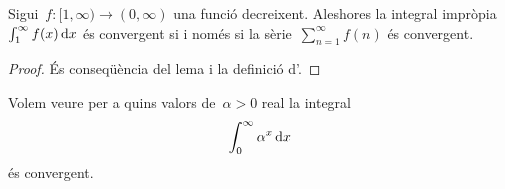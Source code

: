 \documentclass[../../main.tex]{subfiles}
\begin{document}
    \begin{solution}
    \end{solution}
    \begin{theorem}
        \label{thm:criteri de la integral per integrals impròpies}
        Sigui~\(f\colon[1,\infty)\longrightarrow(0,\infty)\) una funció decreixent.
        Aleshores la integral impròpia~\(\int_{1}^{\infty}f(x)\mathop{}\!\mathrm{d} x\) és convergent si i només si la sèrie~\(\sum_{n=1}^{\infty}f(n)\) és convergent.
    \end{theorem}
    \begin{proof}
        És conseqüència del lema  i la definició d'.
    \end{proof}
    \begin{example}
        \label{ex:criteri de la integral per integrals impròpies}
        Volem veure per a quins valors de~\(\alpha>0\) real la integral
        \begin{equation}
            \label{ex:criteri de la integral per integrals impròpies:eq1}
            \int_{0}^{\infty}\alpha^{x}\mathop{}\!\mathrm{d} x
        \end{equation}
        és convergent.
    \end{example}
    \begin{solution}
    \end{solution}
\end{document}
